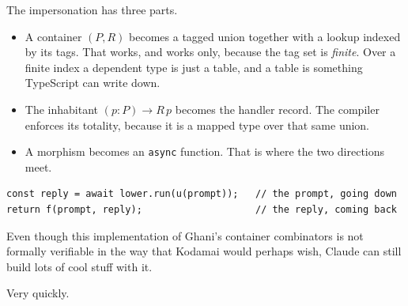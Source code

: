 \documentclass[aspectratio=169,12pt]{beamer}
\begin{document}
\begin{frame}[fragile]
\vfill
\begin{center}
\begin{minipage}{0.90\textwidth}

The impersonation has three parts.

\medskip

\begin{itemize}\setlength{\itemsep}{0.7em}

\item A container $(P, R)$ becomes a tagged union together with a lookup indexed by its tags. That
works, and works only, because the tag set is \emph{finite}. Over a finite index a dependent type
is just a table, and a table is something TypeScript can write down.

\item The inhabitant $(p : P) \to R\,p$ becomes the handler record. The compiler enforces its
totality, because it is a mapped type over that same union.

\item A morphism becomes an \texttt{async} function. That is where the two directions meet.

\end{itemize}

\medskip

\begin{lstlisting}[basicstyle=\ttfamily\footnotesize]
const reply = await lower.run(u(prompt));   // the prompt, going down
return f(prompt, reply);                    // the reply, coming back
\end{lstlisting}

\end{minipage}
\end{center}
\vfill
\end{frame}

\begin{frame}
\vfill
\begin{center}
\begin{minipage}{0.86\textwidth}
\centering
\setlength{\parindent}{0pt}
\Large

Even though this implementation of Ghani's container combinators is not formally verifiable in the
way that Kodamai would perhaps wish, Claude can still build lots of cool stuff with it.

\bigskip

Very quickly.

\end{minipage}
\end{center}
\vfill
\end{frame}
\end{document}
